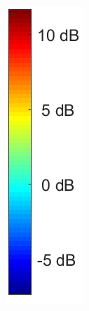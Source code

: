 \begin{minipage}{0.1\textwidth}
\begin{figure}[!htbp]
\includegraphics[width=\textwidth]{figures/Not_Norm_space_colorbar.png}
\end{figure}
\end{minipage}

